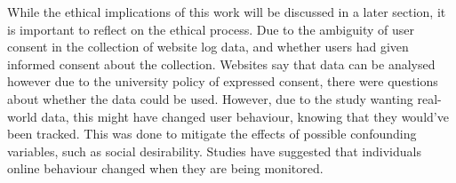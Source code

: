 While the ethical implications of this work will be discussed in a later section, it is important to reflect on the ethical process. Due to the ambiguity of user consent in the collection of website log data, and whether users had given informed consent about the collection. Websites say that data can be analysed however due to the university policy of expressed consent, there were questions about whether the data could be used. However, due to the study wanting real-world data, this might have changed user behaviour, knowing that they would've been tracked. This was done to mitigate the effects of possible confounding variables, such as social desirability. Studies have suggested that individuals online behaviour changed when they are being monitored.